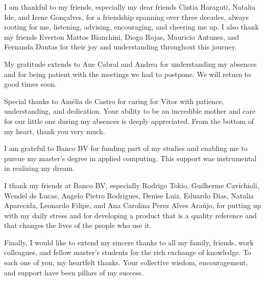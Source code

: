 \begin{dedication}
I am thankful to my friends, especially my dear friends Cintia Haraguti, Natalia Ide, and Irene Gonçalves, for a friendship spanning over three decades, always rooting for me, listening, advising, encouraging, and cheering me up. I also thank my friends Everton Mattos Bianchini, Diogo Rojas, Mauricio Antunes, and Fernanda Dantas for their joy and understanding throughout this journey.

My gratitude extends to Ane Cabral and Andrea for understanding my absences and for being patient with the meetings we had to postpone. We will return to good times soon.

Special thanks to Amélia de Castro for caring for Vitor with patience, understanding, and dedication. Your ability to be an incredible mother and care for our little one during my absences is deeply appreciated. From the bottom of my heart, thank you very much.

I am grateful to Banco BV for funding part of my studies and enabling me to pursue my master's degree in applied computing. This support was instrumental in realizing my dream.

I thank my friends at Banco BV, especially Rodrigo Tokio, Guilherme Cavichioli, Wendel de Lucas, Angelo Pietro Rodrigues, Denise Luiz, Eduardo Dias, Natalia Aparecida, Leonardo Filipe, and Ana Carolina Perez Alves Araújo, for putting up with my daily stress and for developing a product that is a quality reference and that changes the lives of the people who use it.

Finally, I would like to extend my sincere thanks to all my family, friends, work colleagues, and fellow master's students for the rich exchange of knowledge. To each one of you, my heartfelt thanks. Your collective wisdom, encouragement, and support have been pillars of my success.
\end{dedication}

